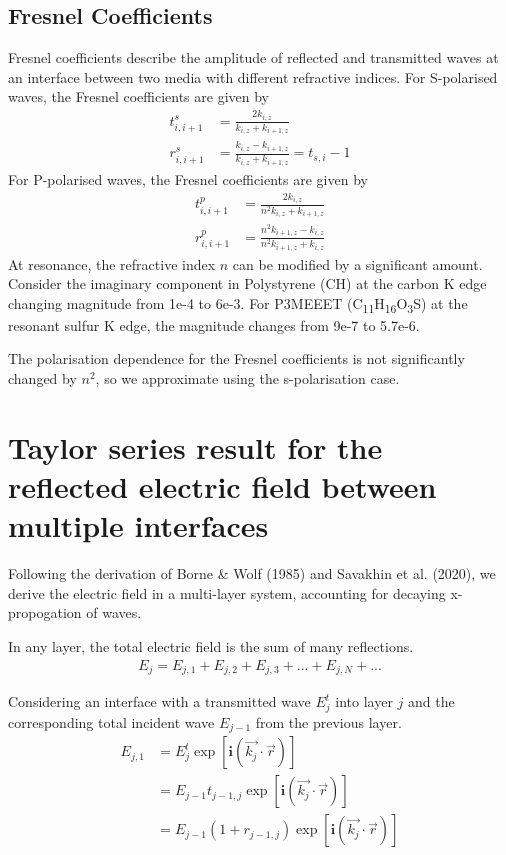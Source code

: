 \documentclass[../main.tex]{subfiles}
\begin{document}
	\subsection{Fresnel Coefficients}
	Fresnel coefficients describe the amplitude of reflected and transmitted waves at an interface between two media with different refractive indices. For S-polarised waves, the Fresnel coefficients are given by
	\begin{align}
		t_{i, i+1}^{s} &= \frac{2 k_{i, z}}{k_{i, z} + k_{i+1, z}} \\
		r_{i, i+1}^{s} &= \frac{k_{i, z} - k_{i+1, z}}{k_{i,z} + k_{i+1,z}} = t_{s,i} - 1
	\end{align}
	For P-polarised waves, the Fresnel coefficients are given by
	\begin{align}
		t_{i, i+1}^{p} &= \frac{2 k_{i, z}}{n^2 k_{i, z} + k_{i+1, z}} \\
		r_{i, i+1}^{p} &= \frac{n^2 k_{i+1, z} - k_{i, z}}{n^2 k_{i+1,z} + k_{i,z}}
	\end{align}
	At resonance, the refractive index $n$ can be modified by a significant amount. Consider the imaginary component in Polystyrene (CH) at the carbon K edge changing magnitude from 1e-4 to 6e-3. For P3MEEET (C\textsubscript{11}H\textsubscript{16}O\textsubscript{3}S) at the resonant sulfur K edge, the magnitude changes from 9e-7 to 5.7e-6.

	The polarisation dependence for the Fresnel coefficients is not significantly changed by $n^2$, so we approximate using the s-polarisation case.

	\section{Taylor series result for the reflected electric field between multiple interfaces}
	Following the derivation of Borne \& Wolf (1985) and Savakhin et al. (2020), we derive the electric field in a multi-layer system, accounting for decaying x-propogation of waves.

	In any layer, the total electric field is the sum of many reflections.
	\begin{align}
		E_j = E_{j,1} + E_{j,2} + E_{j,3} + ... + E_{j,N} + ...
	\end{align}
	
	Considering an interface with a transmitted wave $E^t_{j}$ into layer $j$ and the corresponding total incident wave $E_{j-1}$ from the previous layer.
	\begin{align}
		E_{j,1} &= E^t_{j} \exp\left[\mathbf{i}\left(\vec{k_j}\cdot \vec{r}\right)\right] \\
		&= E_{j-1} t_{j-1,j} \exp\left[\mathbf{i}\left(\vec{k_j}\cdot \vec{r}\right)\right] \\
		&= E_{j-1} 
			\left(1 + r_{j-1,j}\right)
			\exp\left[\mathbf{i}\left(\vec{k_j}\cdot \vec{r}\right)\right]
	\end{align}
	
\end{document}
